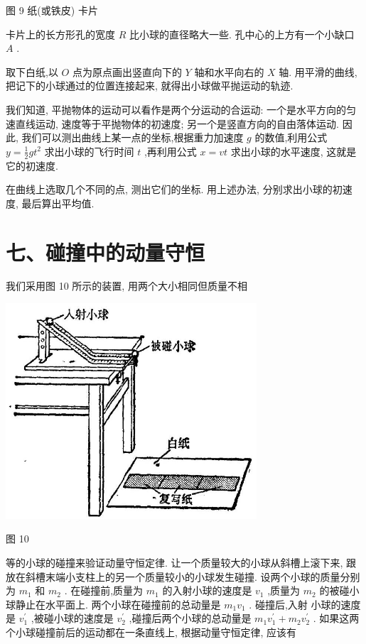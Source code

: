\documentclass[10pt]{article}
\begin{document}
图 9 纸(或铁皮) 卡片

卡片上的长方形孔的宽度 \(R\) 比小球的直径略大一些. 孔中心的上方有一个小缺口 \(A\) .

取下白纸,以 \(O\) 点为原点画出竖直向下的 \(Y\) 轴和水平向右的 \(X\) 轴. 用平滑的曲线,把记下的小球通过的位置连接起来, 就得出小球做平抛运动的轨迹.

我们知道, 平抛物体的运动可以看作是两个分运动的合运动: 一个是水平方向的匀速直线运动, 速度等于平抛物体的初速度; 另一个是竖直方向的自由落体运动. 因此, 我们可以测出曲线上某一点的坐标,根据重力加速度 \(g\) 的数值,利用公式 \(y = \frac{1}{2}g{t}^{2}\) 求出小球的飞行时间 \(t\) ,再利用公式 \(x = {vt}\) 求出小球的水平速度, 这就是它的初速度.

在曲线上选取几个不同的点, 测出它们的坐标. 用上述办法, 分别求出小球的初速度, 最后算出平均值.

\section*{七、碰撞中的动量守恒}

我们采用图 10 所示的装置, 用两个大小相同但质量不相

\begin{center}
\includegraphics[max width=0.7\textwidth]{images/01912d55-147c-70aa-b0e0-1782a122f948_328_878286.jpg}
\end{center}

图 10

等的小球的碰撞来验证动量守恒定律. 让一个质量较大的小球从斜槽上滚下来, 跟放在斜槽末端小支柱上的另一个质量较小的小球发生碰撞. 设两个小球的质量分别为 \({m}_{1}\) 和 \({m}_{2}\) . 在碰撞前,质量为 \({m}_{1}\) 的入射小球的速度是 \({v}_{1}\) ,质量为 \({m}_{2}\) 的被碰小球静止在水平面上. 两个小球在碰撞前的总动量是 \({m}_{1}{v}_{1}\) . 碰撞后,入射 小球的速度是 \({v}_{1}^{\prime }\) ,被碰小球的速度是 \({v}_{2}^{\prime }\) ,碰撞后两个小球的总动量是 \({m}_{1}{v}_{1}^{\prime } + {m}_{2}{v}_{2}^{\prime }\) . 如果这两个小球碰撞前后的运动都在一条直线上, 根据动量守恒定律, 应该有
\end{document}
